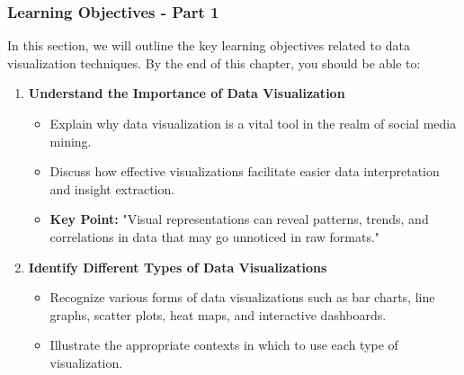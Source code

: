 \documentclass{beamer}
\begin{document}
\begin{frame}[fragile]
    \frametitle{Learning Objectives - Part 1}
    In this section, we will outline the key learning objectives related to data visualization techniques. By the end of this chapter, you should be able to:
    \begin{enumerate}
        \item \textbf{Understand the Importance of Data Visualization}  
            \begin{itemize}
                \item Explain why data visualization is a vital tool in the realm of social media mining.
                \item Discuss how effective visualizations facilitate easier data interpretation and insight extraction.
                \item \textbf{Key Point:} "Visual representations can reveal patterns, trends, and correlations in data that may go unnoticed in raw formats."
            \end{itemize}
        
        \item \textbf{Identify Different Types of Data Visualizations}  
            \begin{itemize}
                \item Recognize various forms of data visualizations such as bar charts, line graphs, scatter plots, heat maps, and interactive dashboards.
                \item Illustrate the appropriate contexts in which to use each type of visualization.
            \end{itemize}
    \end{enumerate}
\end{frame}
\end{document}
